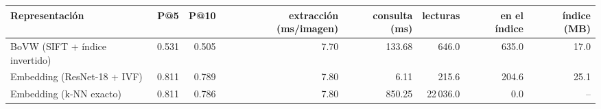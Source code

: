 \begin{tabular}{@{}lrrrrrrr@{}}
\toprule
Representación & P@5 & P@10 & extracción (ms/imagen) & consulta (ms) & lecturas & en el índice & índice (MB) \\
\midrule
BoVW (SIFT + índice invertido) & 0.531 & 0.505 & 7.70 & 133.68 & 646.0 & 635.0 & 17.0 \\
Embedding (ResNet-18 + IVF) & 0.811 & 0.789 & 7.80 & 6.11 & 215.6 & 204.6 & 25.1 \\
Embedding (k-NN exacto) & 0.811 & 0.786 & 7.80 & 850.25 & 22\,036.0 & 0.0 & -- \\
\bottomrule
\end{tabular}
